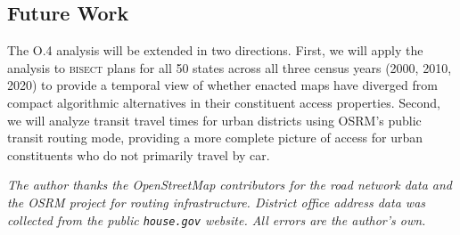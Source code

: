 \subsection{Future Work}

The O.4 analysis will be extended in two directions. First, we will apply the analysis
to \textsc{bisect} plans for all 50 states across all three census years (2000, 2010, 2020)
to provide a temporal view of whether enacted maps have diverged from compact algorithmic
alternatives in their constituent access properties. Second, we will analyze transit
travel times for urban districts using OSRM's public transit routing mode, providing
a more complete picture of access for urban constituents who do not primarily travel
by car.

\bigskip
\noindent\textit{The author thanks the OpenStreetMap contributors for the road network
data and the OSRM project for routing infrastructure. District office address data
was collected from the public \texttt{house.gov} website. All errors are the author's own.}
